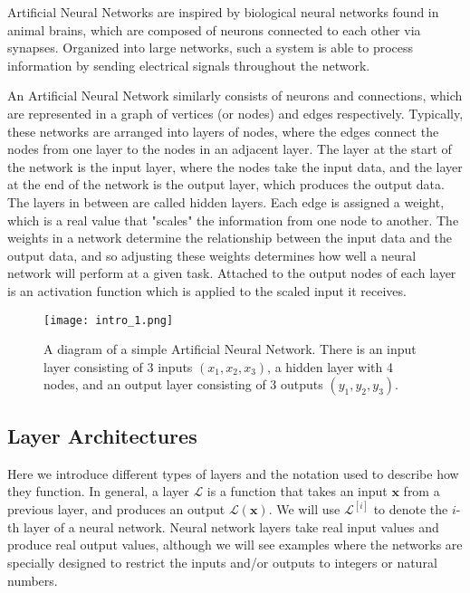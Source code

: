 \documentclass{somasmsc}
\begin{document}
Artificial Neural Networks are inspired by biological neural networks found in animal brains, which are composed of neurons connected to each other via synapses. Organized into large networks, such a system is able to process information by sending electrical signals throughout the network.

An Artificial Neural Network similarly consists of neurons and connections, which are represented in a graph of vertices (or nodes) and edges respectively. Typically, these networks are arranged into layers of nodes, where the edges connect the nodes from one layer to the nodes in an adjacent layer. The layer at the start of the network is the input layer, where the nodes take the input data, and the layer at the end of the network is the output layer, which produces the output data. The layers in between are called hidden layers. Each edge is assigned a weight, which is a real value that "scales" the information from one node to another. The weights in a network determine the relationship between the input data and the output data, and so adjusting these weights determines how well a neural network will perform at a given task. Attached to the output nodes of each layer is an activation function which is applied to the scaled input it receives.

\begin{figure}[H]
\begin{center}
\texttt{[image: intro\_1.png]}
\end{center}
\caption{A diagram of a simple Artificial Neural Network. There is an input layer consisting of 3 inputs $\left(x_1, x_2, x_3\right)$, a hidden layer with 4 nodes, and an output layer consisting of 3 outputs $\left(y_1, y_2, y_3\right)$.}
\end{figure}

\subsection{Layer Architectures}

Here we introduce different types of layers and the notation used to describe how they function. In general, a layer $\mathcal{L}$ is a function that takes an input $\pmb{x}$ from a previous layer, and produces an output $\mathcal{L}\left(\pmb{x}\right)$. We will use $\mathcal{L}^{\left[i\right]}$ to denote the $i$-th layer of a neural network. Neural network layers take real input values and produce real output values, although we will see examples where the networks are specially designed to restrict the inputs and/or outputs to integers or natural numbers.
\end{document}
